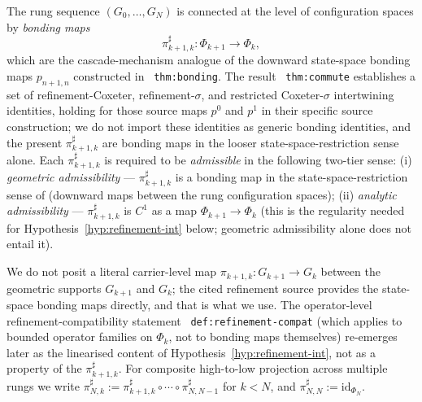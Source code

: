\documentclass[11pt]{article}
\theoremstyle{definition}
\begin{document}
The rung sequence $(G_0, \ldots, G_N)$ is connected at the level of
configuration spaces by \emph{bonding maps}
\begin{equation}\label{eq:pushforward}
   \pi^{\sharp}_{k+1, k} : \Phi_{k+1} \longrightarrow \Phi_k,
\end{equation}
which are the cascade-mechanism analogue of the downward
state-space bonding maps $p_{n+1, n}$ constructed in
\cite{CascadeRefinementSpaces}~\texttt{thm:bonding}. The result \cite{CascadeRefinementSpaces}~\texttt{thm:commute}
establishes a set of refinement-Coxeter, refinement-$\sigma$, and
restricted Coxeter-$\sigma$ intertwining identities, holding for
those source maps $p^0$ and $p^1$ in their specific source
construction; we do not import these identities as generic bonding
identities, and the present $\pi^{\sharp}_{k+1, k}$ are bonding maps
in the looser state-space-restriction sense alone. Each $\pi^{\sharp}_{k+1, k}$ is
required to be \emph{admissible} in the following two-tier sense:
(i) \emph{geometric admissibility} --- $\pi^{\sharp}_{k+1, k}$ is a
bonding map in the state-space-restriction sense of
\cite{CascadeRefinementSpaces} (downward maps between the rung
configuration spaces);
(ii) \emph{analytic admissibility} --- $\pi^{\sharp}_{k+1, k}$ is
$C^1$ as a map $\Phi_{k+1} \to \Phi_k$ (this is the regularity needed
for Hypothesis~\ref{hyp:refinement-int} below; geometric admissibility
alone does not entail it).

We do not posit a literal carrier-level map
$\pi_{k+1, k} : G_{k+1} \to G_k$ between the geometric supports
$G_{k+1}$ and $G_k$; the cited refinement source provides the
state-space bonding maps directly, and that is what we use. The
operator-level refinement-compatibility statement
\cite{CascadeClosureDynamics}~\texttt{def:refinement-compat} (which
applies to bounded operator families on $\Phi_k$, not to bonding
maps themselves) re-emerges later as the linearised content of
Hypothesis~\ref{hyp:refinement-int}, not as a property of the
$\pi^{\sharp}_{k+1, k}$. For composite high-to-low
projection across multiple rungs we write
$\pi^{\sharp}_{N, k} := \pi^{\sharp}_{k+1, k} \circ \cdots \circ \pi^{\sharp}_{N, N-1}$ for $k < N$, and $\pi^{\sharp}_{N, N} := \mathrm{id}_{\Phi_N}$.
\end{document}
